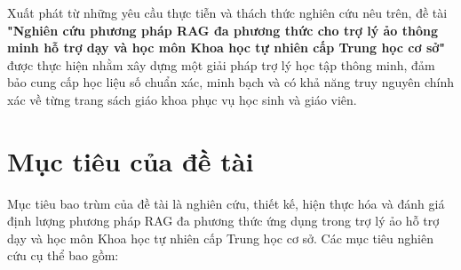 Xuất phát từ những yêu cầu thực tiễn và thách thức nghiên cứu nêu trên, đề tài \textbf{"Nghiên cứu phương pháp RAG đa phương thức cho trợ lý ảo thông minh hỗ trợ dạy và học môn Khoa học tự nhiên cấp Trung học cơ sở"} được thực hiện nhằm xây dựng một giải pháp trợ lý học tập thông minh, đảm bảo cung cấp học liệu số chuẩn xác, minh bạch và có khả năng truy nguyên chính xác về từng trang sách giáo khoa phục vụ học sinh và giáo viên.

\section{Mục tiêu của đề tài}
Mục tiêu bao trùm của đề tài là nghiên cứu, thiết kế, hiện thực hóa và đánh giá định lượng phương pháp RAG đa phương thức ứng dụng trong trợ lý ảo hỗ trợ dạy và học môn Khoa học tự nhiên cấp Trung học cơ sở. Các mục tiêu nghiên cứu cụ thể bao gồm:

